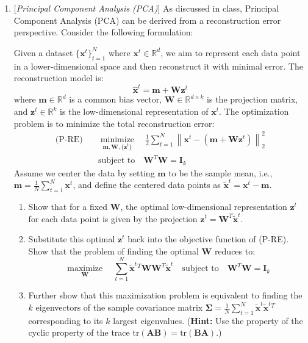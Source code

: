 \documentclass[10pt]{article}
\begin{document}
\begin{enumerate}
\newpage

\item {} [\textit{Principal Component Analysis (PCA)}]
As discussed in class, Principal Component Analysis (PCA) can be derived from a reconstruction error perspective. Consider the following formulation:

Given a dataset $\{\mathbf{x}^t\}_{t=1}^N$ where $\mathbf{x}^t \in \mathbb{R}^d$, we aim to represent each data point in a lower-dimensional space and then reconstruct it with minimal error. The reconstruction model is:
\[
\hat{\mathbf{x}}^t = \mathbf{m} + \mathbf{W} \mathbf{z}^t
\]
where $\mathbf{m} \in \mathbb{R}^d$ is a common bias vector, $\mathbf{W} \in \mathbb{R}^{d \times k}$ is the projection matrix, and $\mathbf{z}^t \in \mathbb{R}^k$ is the low-dimensional representation of $\mathbf{x}^t$. The optimization problem is to minimize the total reconstruction error:
\begin{align*}
	\text{(P-RE)} \quad & \underset{\mathbf{m}, \mathbf{W}, \{\mathbf{z}^t\}}{\operatorname{minimize}} \quad \frac{1}{2} \sum_{t=1}^{N} \left\| \mathbf{x}^t - (\mathbf{m} + \mathbf{W} \mathbf{z}^t) \right\|_2^2 \\
	& \text{subject to} \quad \mathbf{W}^T \mathbf{W} = \mathbf{I}_k
\end{align*}
Assume we center the data by setting $\mathbf{m}$ to be the sample mean, i.e., $\mathbf{m} = \frac{1}{N}\sum_{t=1}^N \mathbf{x}^t$, and define the centered data points as $\tilde{\mathbf{x}}^t = \mathbf{x}^t - \mathbf{m}$.
\begin{enumerate}
	\item {} Show that for a fixed $\mathbf{W}$, the optimal low-dimensional representation $\mathbf{z}^t$ for each data point is given by the projection $\mathbf{z}^t = \mathbf{W}^T \tilde{\mathbf{x}}^t$.
	\item {} Substitute this optimal $\mathbf{z}^t$ back into the objective function of (P-RE). Show that the problem of finding the optimal $\mathbf{W}$ reduces to:
	\[
	\underset{\mathbf{W}}{\operatorname{maximize}} \quad \sum_{t=1}^{N} \tilde{\mathbf{x}}^t{}^T \mathbf{W} \mathbf{W}^T \tilde{\mathbf{x}}^t \quad \text{subject to} \quad \mathbf{W}^T \mathbf{W} = \mathbf{I}_k
	\]
	\item {} Further show that this maximization problem is equivalent to finding the $k$ eigenvectors of the sample covariance matrix $\boldsymbol{\Sigma} = \frac{1}{N} \sum_{t=1}^N \tilde{\mathbf{x}}^t \tilde{\mathbf{x}}^t{}^T$ corresponding to its $k$ largest eigenvalues. (\textbf{Hint:} Use the property of the cyclic property of the trace $\mathrm{tr}\left(\mathbf{AB}\right)=\mathrm{tr}\left(\mathbf{BA}\right)$.)
\end{enumerate}



\end{enumerate}
\end{document}
